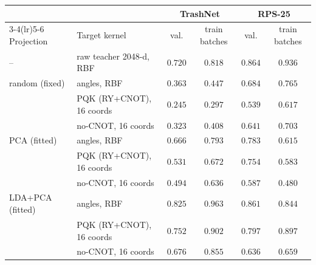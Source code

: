 \begin{tabular}{@{}llcccc@{}}
\toprule
 & & \multicolumn{2}{c}{TrashNet} & \multicolumn{2}{c}{RPS-25} \\
\cmidrule(lr){3-4}\cmidrule(lr){5-6}
Projection & Target kernel & val. & train batches & val. & train batches \\
\midrule
-- & raw teacher 2048-d, RBF & $0.720$ & $0.818$ & $0.864$ & $0.936$ \\
\midrule
random (fixed) & angles, RBF & $0.363$ & $0.447$ & $0.684$ & $0.765$ \\
 & PQK (RY+CNOT), 16 coords & $0.245$ & $0.297$ & $0.539$ & $0.617$ \\
 & no-CNOT, 16 coords & $0.323$ & $0.408$ & $0.641$ & $0.703$ \\
\midrule
PCA (fitted) & angles, RBF & $0.666$ & $0.793$ & $0.783$ & $0.615$ \\
 & PQK (RY+CNOT), 16 coords & $0.531$ & $0.672$ & $0.754$ & $0.583$ \\
 & no-CNOT, 16 coords & $0.494$ & $0.636$ & $0.587$ & $0.480$ \\
\midrule
LDA+PCA (fitted) & angles, RBF & $0.825$ & $0.963$ & $0.861$ & $0.844$ \\
 & PQK (RY+CNOT), 16 coords & $0.752$ & $0.902$ & $0.797$ & $0.897$ \\
 & no-CNOT, 16 coords & $0.676$ & $0.855$ & $0.636$ & $0.659$ \\
\bottomrule
\end{tabular}
